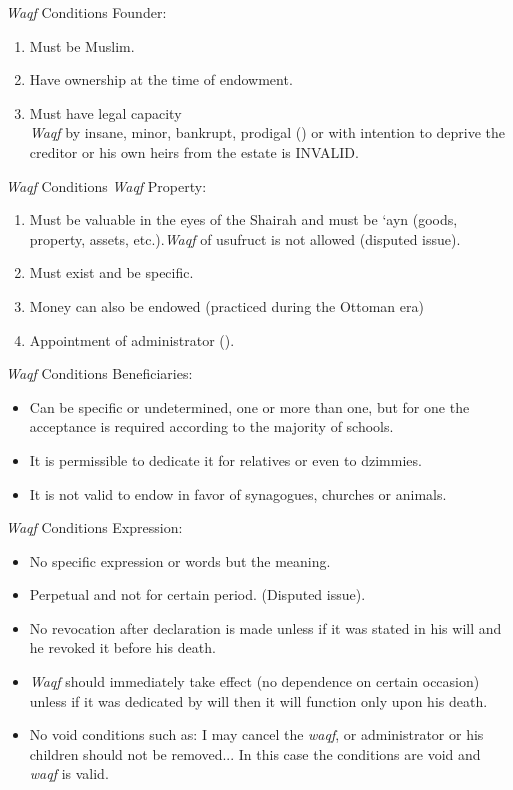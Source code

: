 \begin{frame}{\textit{Waqf} Conditions}
 Founder:
\begin{enumerate}
\item Must be Muslim.
\item Have ownership at the time of endowment.
\item Must have legal capacity\\\textit{Waqf} by insane, minor, bankrupt, prodigal () or with intention to deprive the creditor or his own heirs from the estate is \alert{INVALID}.
\end{enumerate}
\end{frame}

\begin{frame}{\textit{Waqf} Conditions}
 \textit{Waqf} Property:
\begin{enumerate}
  \item Must be valuable in the eyes of the Shairah and must be ‘ayn (goods, property, assets, etc.).\textit{Waqf} of usufruct is not allowed (disputed issue).
  \item Must exist and be specific.
  \item Money can also be endowed (practiced during the Ottoman era)
  \item Appointment of administrator ().
\end{enumerate}
\end{frame}

\begin{frame}{\textit{Waqf} Conditions}
 Beneficiaries:
\begin{itemize}
\item Can be specific or undetermined, one or more than one, but for one the acceptance is required according to the majority of schools.
\item It is permissible to dedicate it for relatives or even to dzimmies.
\item It is not valid to endow in favor of synagogues, churches or animals. 
\end{itemize}
\end{frame}

\begin{frame}{\textit{Waqf} Conditions}
 Expression:
\begin{itemize}
\item No specific expression or words but the meaning.
\item Perpetual and not for certain period. (Disputed issue).
\item No revocation after declaration is made unless if it was stated in his will and he revoked it before his death.
\item \textit{Waqf} should immediately take effect (no dependence on certain occasion) unless if it was dedicated by will then it will function only upon his death.
\item No void conditions such as: I may cancel the \textit{waqf}, or administrator or his children should not be removed... In this case the conditions are void and  \textit{waqf} is valid.
\end{itemize}
\end{frame}

